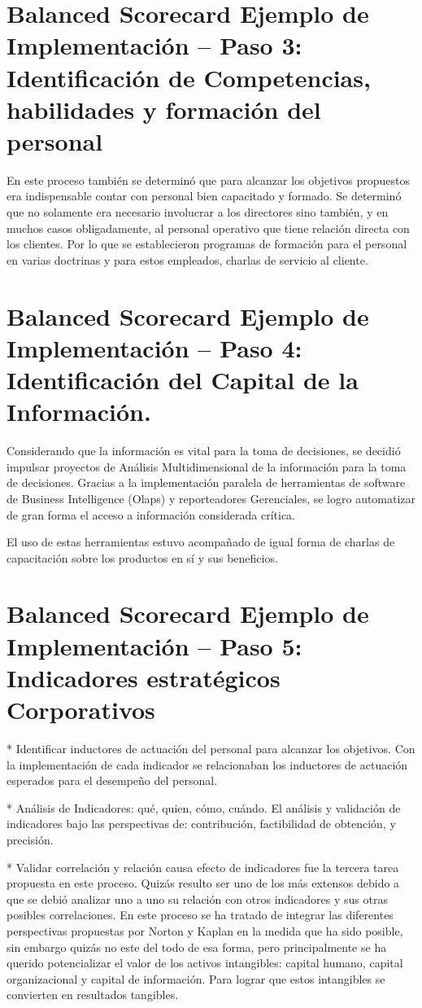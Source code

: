 \section{Balanced Scorecard Ejemplo de Implementación – Paso 3: Identificación de Competencias, habilidades y formación del personal}
\item {En este proceso también se determinó que para alcanzar los objetivos propuestos era indispensable contar con personal bien capacitado y formado. Se determinó que no solamente era necesario involucrar a los directores sino también, y en muchos casos obligadamente, al personal operativo que tiene relación directa con los clientes. Por lo que se establecieron programas de formación para el personal en varias doctrinas y para estos empleados, charlas de servicio al cliente.}

\section{Balanced Scorecard Ejemplo de Implementación – Paso 4: Identificación del Capital de la Información.}
\item {Considerando que la información es vital para la toma de decisiones, se decidió impulsar proyectos de Análisis Multidimensional de la información para la toma de decisiones. Gracias a la implementación paralela de herramientas de software de Business Intelligence (Olaps) y reporteadores Gerenciales, se logro automatizar de gran forma el acceso a información considerada crítica.

El uso de estas herramientas estuvo acompañado de igual forma de charlas de capacitación sobre los productos en sí y sus beneficios.}

\section{Balanced Scorecard Ejemplo de Implementación – Paso 5: Indicadores estratégicos Corporativos}
\item {* Identificar inductores de actuación del personal para alcanzar los objetivos. Con la implementación de cada indicador se relacionaban los inductores de actuación esperados para el desempeño del personal.

* Análisis de Indicadores: qué, quien, cómo, cuándo. El análisis y validación de indicadores bajo las perspectivas de: contribución, factibilidad de obtención, y precisión.

* Validar correlación y relación causa efecto de indicadores fue la tercera tarea propuesta en este proceso. Quizás resulto ser uno de los más extensos debido a que se debió analizar uno a uno su relación con otros indicadores y sus otras posibles correlaciones. En este proceso se ha tratado de integrar las diferentes perspectivas propuestas por Norton y Kaplan en la medida que ha sido posible, sin embargo quizás no este del todo de esa forma, pero principalmente se ha querido potencializar el valor de los activos intangibles: capital humano, capital organizacional y capital de información. Para lograr que estos intangibles se convierten en resultados tangibles.}

